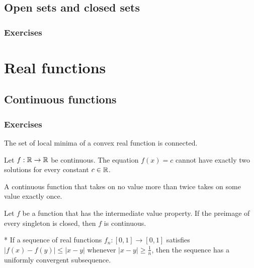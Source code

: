 \documentclass{../note}
\begin{document}
\chapter{Open sets and closed sets}



\section*{Exercises}



\part{Real functions}

\chapter{Continuous functions}

\section*{Exercises}

\begin{prb}
The set of local minima of a convex real function is connected.
\end{prb}

\begin{prb}
Let $f:\mathbb{R}\to\mathbb{R}$ be continuous.
The equation $f(x)=c$ cannot have exactly two solutions for every constant $c\in\mathbb{R}$.
\end{prb}

\begin{prb}
A continuous function that takes on no value more than twice takes on some value exactly once.
\end{prb}

\begin{prb}
Let $f$ be a function that has the intermediate value property.
If the preimage of every singleton is closed, then $f$ is continuous.
\end{prb}

\begin{prb}*
If a sequence of real functions $f_n\colon[0,1]\to[0,1]$ satisfies $|f(x)-f(y)|\le|x-y|$ whenever $|x-y|\ge\frac1n$, then the sequence has a uniformly convergent subsequence.
\end{prb}
\end{document}
